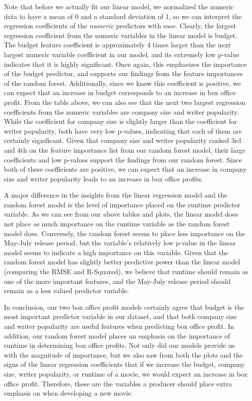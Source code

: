 \documentclass[10pt]{article}
\begin{document}
Note that before we actually fit our linear model, we normalized the numeric data to have a mean of 0 and a standard deviation of 1, so we can interpret the regression coefficients of the \textit{numeric} predictors with ease. Clearly, the largest regression coefficient from the numeric variables in the linear model is budget. The budget feature coefficient is approximately 4 times larger than the next largest numeric variable coefficient in our model, and its extremely low p-value indicates that it is highly significant. Once again, this emphasizes the importance of the budget predictor, and supports our findings from the feature importances of the random forest. Additionally, since we know this coefficient is positive, we can expect that an increase in budget corresponds to an increase in box office profit. From the table above, we can also see that the next two largest regression coefficients from the numeric variables are company size and writer popularity. While the coefficient for company size is slightly larger than the coefficient for writer popularity, both have very low p-values, indicating that each of them are certainly significant. Given that company size and writer popularity ranked 3rd and 4th on the feature importance list from our random forest model, their large coefficients and low p-values support the findings from our random forest. Since both of these coefficients are positive, we can expect that an increase in company size and writer popularity leads to an increase in box office profits.

A major difference in the insights from the linear regression model and the random forest model is the level of importance placed on the runtime predictor variable. As we can see from our above tables and plots, the linear model does not place as much importance on the runtime variable as the random forest model does. Conversely, the random forest seems to place less importance on the May-July release period, but the variable’s relatively low p-value in the linear model seems to indicate a high importance on this variable. Given that the random forest model has slightly better predictive power than the linear model (comparing the RMSE and R-Squared), we believe that runtime should remain as one of the more important features, and the May-July release period should remain as a less valued predictor variable.

In conclusion, our two box office profit models certainly agree that budget is the most important predictor variable in our dataset, and that both company size and writer popularity are useful features when predicting box office profit. In addition, our random forest model places an emphasis on the importance of runtime in determining box office profits. Not only did our models provide us with the magnitude of importance, but we also saw from both the plots and the signs of the linear regression coefficients that if we increase the budget, company size, writer popularity, or runtime of a movie, we would expect an increase in box office profit. Therefore, these are the variables a producer should place extra emphasis on when developing a new movie.
\end{document}
